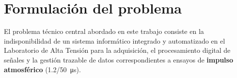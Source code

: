 
\section{Formulación del problema} \label{sec:formulacion_problema}

El problema técnico central abordado en este trabajo consiste en la indisponibilidad de un sistema informático integrado y automatizado en el Laboratorio de Alta Tensión para la adquisición, el procesamiento digital de señales y la gestión trazable de datos correspondientes a ensayos de \textbf{impulso atmosférico} (\qty[parse-numbers=false]{1.2/50}{\micro\second}).
